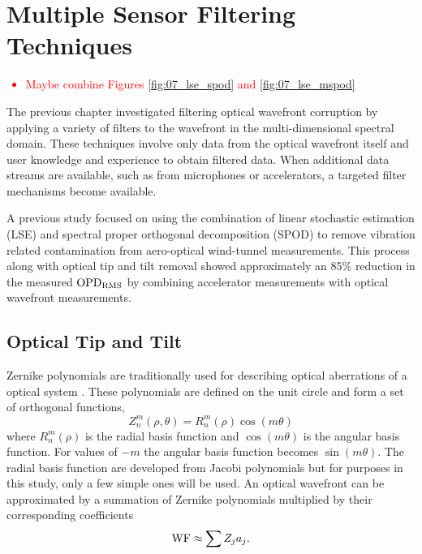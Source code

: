 
\chapter{Multiple Sensor Filtering Techniques}
\label{chap:07_multiple_filter}
\textcolor{red}{
  \begin{itemize}
    \item Maybe combine Figures \ref{fig:07_lse_spod} and \ref{fig:07_lse_mspod}
  \end{itemize}
}


The previous chapter investigated filtering optical wavefront corruption by applying a variety of filters to the wavefront in the multi-dimensional spectral domain.
These techniques involve only data from the optical wavefront itself and user knowledge and experience to obtain filtered data.
When additional data streams are available, such as from microphones or accelerators, a targeted filter mechanisms become available.


A previous study \cite{DeLucca-2014-RAJvGdv7} focused on using the combination of linear stochastic estimation (LSE) and spectral proper orthogonal decomposition (SPOD) to remove vibration related contamination from aero-optical wind-tunnel measurements.
This process along with optical tip and tilt removal showed approximately an 85\% reduction in the measured $\operatorname{OPD_{RMS}}$ by combining accelerator measurements with optical wavefront measurements.

\section{Optical Tip and Tilt}
Zernike polynomials are traditionally used for describing optical aberrations of a optical system \cite{Born-1965-HHGYgjdH}.
These polynomials are defined on the unit circle and form a set of orthogonal functions,
\begin{equation}
  Z_n^m(\rho,\theta) = R_n^m(\rho)\cos(m\theta)
  \label{eqn:07_zernike}
\end{equation}
where $R_n^m(\rho)$ is the radial basis function and $\cos(m\theta)$ is the angular basis function.
For values of $-m$ the angular basis function becomes $\sin(m\theta)$.
The radial basis function are developed from Jacobi polynomials but for purposes in this study, only a few simple ones will be used.
An optical wavefront can be approximated by a summation of Zernike polynomials multiplied by their corresponding coefficients
\begin{equation}
  \operatorname{WF} \approx \sum Z_ja_j \textrm{.}
  \label{eqn:07_zernike_coeff}
\end{equation}

